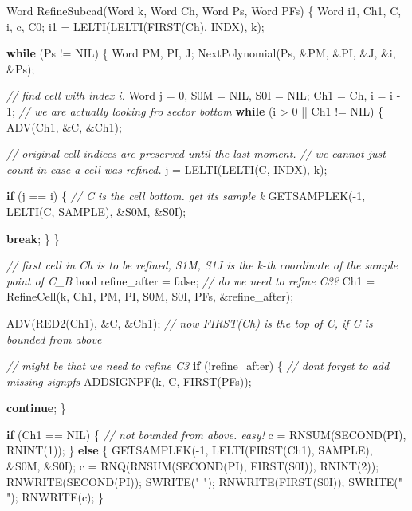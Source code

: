 \documentclass[
]{book}
\newenvironment{Shaded}{\begin{snugshade}}{\end{snugshade}}
\newcommand{\CommentTok}[1]{\textcolor[rgb]{0.56,0.35,0.01}{\textit{#1}}}
\newcommand{\ControlFlowTok}[1]{\textcolor[rgb]{0.13,0.29,0.53}{\textbf{#1}}}
\newcommand{\DataTypeTok}[1]{\textcolor[rgb]{0.13,0.29,0.53}{#1}}
\newcommand{\DecValTok}[1]{\textcolor[rgb]{0.00,0.00,0.81}{#1}}
\newcommand{\NormalTok}[1]{#1}
\newcommand{\StringTok}[1]{\textcolor[rgb]{0.31,0.60,0.02}{#1}}
\theoremstyle{definition}
\theoremstyle{definition}
\theoremstyle{definition}
\theoremstyle{definition}
\theoremstyle{remark}
\begin{document}
\begin{Shaded}
\begin{Highlighting}[numbers=left,,]
\NormalTok{Word RefineSubcad(Word k, Word Ch, Word Ps, Word PFs)}
\NormalTok{\{}
\NormalTok{    Word i1, Ch1, C, i, c, C0;}
\NormalTok{    i1 = LELTI(LELTI(FIRST(Ch), INDX), k);}

    \ControlFlowTok{while}\NormalTok{ (Ps != NIL) \{}
\NormalTok{        Word PM, PI, J;}
\NormalTok{        NextPolynomial(Ps, \&PM, \&PI, \&J, \&i, \&Ps);}

        \CommentTok{// find cell with index i.}
\NormalTok{        Word j = }\DecValTok{0}\NormalTok{, S0M = NIL, S0I = NIL;}
\NormalTok{        Ch1 = Ch, i = i {-} }\DecValTok{1}\NormalTok{;  }\CommentTok{// we are actually looking fro sector bottom}
        \ControlFlowTok{while}\NormalTok{ (i \textgreater{} }\DecValTok{0}\NormalTok{ || Ch1 != NIL) \{}
\NormalTok{            ADV(Ch1, \&C, \&Ch1);}

            \CommentTok{// original cell indices are preserved until the last moment.}
            \CommentTok{// we cannot just count in case a cell was refined.}
\NormalTok{            j = LELTI(LELTI(C, INDX), k);}

            \ControlFlowTok{if}\NormalTok{ (j == i) \{}
                \CommentTok{// C is the cell bottom. get its sample k}
\NormalTok{                GETSAMPLEK({-}}\DecValTok{1}\NormalTok{, LELTI(C, SAMPLE), \&S0M, \&S0I);}

                \ControlFlowTok{break}\NormalTok{;}
\NormalTok{            \}}
\NormalTok{        \}}

        \CommentTok{// first cell in Ch is to be refined, S1M, S1J is the k{-}th coordinate of the sample point of C\_B}
        \DataTypeTok{bool}\NormalTok{ refine\_after = false; }\CommentTok{// do we need to refine C3?}
\NormalTok{        Ch1 = RefineCell(k, Ch1, PM, PI, S0M, S0I, PFs, \&refine\_after);}

\NormalTok{        ADV(RED2(Ch1), \&C, \&Ch1);}
        \CommentTok{// now FIRST(Ch) is the top of C, if C is bounded from above}

        \CommentTok{// might be that we need to refine C3}
        \ControlFlowTok{if}\NormalTok{ (!refine\_after) \{}
            \CommentTok{// don\textquotesingle{}t forget to add missing signpfs}
\NormalTok{            ADDSIGNPF(k, C, FIRST(PFs));}

            \ControlFlowTok{continue}\NormalTok{;}
\NormalTok{        \}}

        \ControlFlowTok{if}\NormalTok{ (Ch1 == NIL) \{ }\CommentTok{// not bounded from above. easy!}
\NormalTok{            c = RNSUM(SECOND(PI), RNINT(}\DecValTok{1}\NormalTok{));}
\NormalTok{        \} }\ControlFlowTok{else}\NormalTok{ \{}
\NormalTok{            GETSAMPLEK({-}}\DecValTok{1}\NormalTok{, LELTI(FIRST(Ch1), SAMPLE), \&S0M, \&S0I);}
\NormalTok{            c = RNQ(RNSUM(SECOND(PI), FIRST(S0I)), RNINT(}\DecValTok{2}\NormalTok{));}
\NormalTok{            RNWRITE(SECOND(PI)); SWRITE(}\StringTok{" "}\NormalTok{); RNWRITE(FIRST(S0I)); SWRITE(}\StringTok{" "}\NormalTok{);  RNWRITE(c);}
\NormalTok{        \}}


\end{Highlighting}
\end{Shaded}
\end{document}
